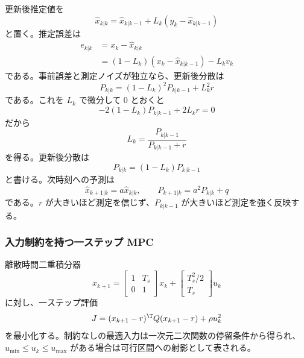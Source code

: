 \begin{derivation}
更新後推定値を
\begin{equation}
  \hat{x}_{k|k}
  =
  \hat{x}_{k|k-1}
  +L_k(y_k-\hat{x}_{k|k-1})
\end{equation}
と置く。推定誤差は
\begin{align}
  e_{k|k}
  &=
  x_k-\hat{x}_{k|k}\\
  &=
  (1-L_k)(x_k-\hat{x}_{k|k-1})-L_k v_k
\end{align}
である。事前誤差と測定ノイズが独立なら、更新後分散は
\begin{equation}
  P_{k|k}
  =
  (1-L_k)^2P_{k|k-1}+L_k^2r
\end{equation}
である。これを $L_k$ で微分して 0 とおくと
\begin{equation}
  -2(1-L_k)P_{k|k-1}+2L_kr=0
\end{equation}
だから
\begin{equation}
  L_k=\frac{P_{k|k-1}}{P_{k|k-1}+r}
\end{equation}
を得る。更新後分散は
\begin{equation}
  P_{k|k}=(1-L_k)P_{k|k-1}
\end{equation}
と書ける。次時刻への予測は
\begin{equation}
  \hat{x}_{k+1|k}=a\hat{x}_{k|k},
  \qquad
  P_{k+1|k}=a^2P_{k|k}+q
\end{equation}
である。$r$ が大きいほど測定を信じず、$P_{k|k-1}$ が大きいほど測定を強く反映する。
\end{derivation}

\subsubsection{入力制約を持つ一ステップ MPC}

離散時間二重積分器
\begin{equation}
  x_{k+1}=
  \begin{bmatrix}
    1&T_s\\0&1
  \end{bmatrix}x_k+
  \begin{bmatrix}
    T_s^2/2\\T_s
  \end{bmatrix}u_k
\end{equation}
に対し、一ステップ評価
\begin{equation}
  J=(x_{k+1}-r)^\T Q(x_{k+1}-r)+\rho u_k^2
\end{equation}
を最小化する。制約なしの最適入力は一次元二次関数の停留条件から得られ、$u_{\min}\le u_k\le u_{\max}$ がある場合は可行区間への射影として表される。

